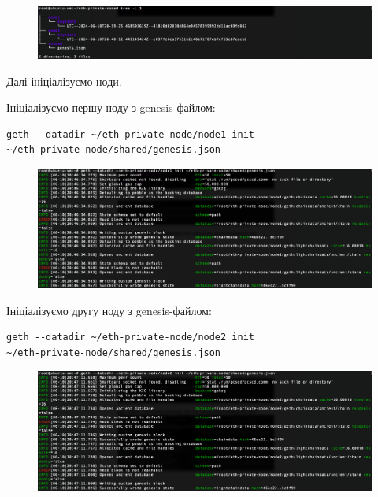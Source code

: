 \vspace{-0.5cm}

\begin{figure}[ht]
        \centering
        \includegraphics[scale=0.35]{IMAGES/tree.png}
        \label{fig_pacman}
\end{figure}

\newpage
Далі ініціалізуємо ноди.

Ініціалізуємо першу ноду з genesis-файлом:
\begin{verbatim}
geth --datadir ~/eth-private-node/node1 init 
~/eth-private-node/shared/genesis.json
\end{verbatim}

\vspace{-0.5cm}

\begin{figure}[ht]
        \centering
        \includegraphics[scale=0.35]{IMAGES/init1.png}
        \label{fig_pacman}
\end{figure}

Ініціалізуємо другу ноду з genesis-файлом:
\begin{verbatim}
geth --datadir ~/eth-private-node/node2 init 
~/eth-private-node/shared/genesis.json
\end{verbatim}

\vspace{-0.5cm}

\begin{figure}[ht]
        \centering
        \includegraphics[scale=0.35]{IMAGES/init2.png}
        \label{fig_pacman}
\end{figure}

